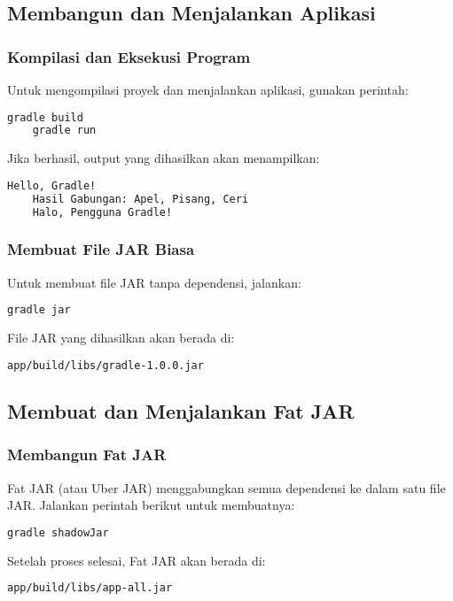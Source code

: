 \subsection{Membangun dan Menjalankan Aplikasi}
\subsubsection{Kompilasi dan Eksekusi Program}
Untuk mengompilasi proyek dan menjalankan aplikasi, gunakan perintah:
\begin{lstlisting}[language=bash]
	gradle build
	gradle run
\end{lstlisting}

Jika berhasil, output yang dihasilkan akan menampilkan:
\begin{lstlisting}[language=bash]
	Hello, Gradle!
	Hasil Gabungan: Apel, Pisang, Ceri
	Halo, Pengguna Gradle!
\end{lstlisting}

\subsubsection{Membuat File JAR Biasa}
Untuk membuat file JAR tanpa dependensi, jalankan:
\begin{lstlisting}[language=bash]
	gradle jar
\end{lstlisting}

File JAR yang dihasilkan akan berada di:
\begin{lstlisting}[language=bash]
	app/build/libs/gradle-1.0.0.jar
\end{lstlisting}

\subsection{Membuat dan Menjalankan Fat JAR}
\subsubsection{Membangun Fat JAR}
Fat JAR (atau Uber JAR) menggabungkan semua dependensi ke dalam satu file JAR. Jalankan perintah berikut untuk membuatnya:
\begin{lstlisting}[language=bash]
	gradle shadowJar
\end{lstlisting}

Setelah proses selesai, Fat JAR akan berada di:
\begin{lstlisting}[language=bash]
	app/build/libs/app-all.jar
\end{lstlisting}

